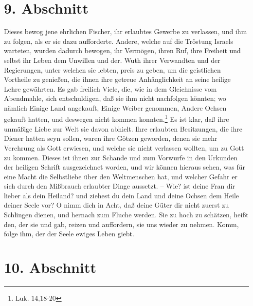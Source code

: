 \section{9. Abschnitt}

Dieses bewog jene ehrlichen Fischer, ihr erlaubtes Gewerbe zu verlassen, und ihm
zu folgen, als er sie dazu aufforderte. Andere, welche auf die Tröstung Israels
warteten, wurden dadurch bewogen, ihr Vermögen, ihren Ruf, ihre Freiheit und
selbst ihr Leben dem Unwillen und der. Wuth ihrer Verwandten und der
Regierungen, unter welchen sie lebten, preis zu geben, um die geistlichen
Vortheile zu genießen, die ihnen ihre getreue Anhänglichkeit an seine heilige
Lehre gewährten. Es gab freilich Viele, die, wie in dem Gleichnisse vom
Abendmahle, sich entschuldigen, daß sie ihm nicht nachfolgen könnten; wo nämlich
Einige Land angekauft, Einige Weiber genommen, Andere Ochsen gekauft hatten, und
deswegen nicht kommen konnten.\footnote{Luk. 14,18-20} Es ist klar, daß ihre
unmäßige Liebe zur Welt sie davon abhielt. Ihre erlaubten Besitzungen, die ihre
Diener hatten seyn sollen, waren ihre Götzen geworden, denen sie mehr Verehrung
als Gott erwiesen, und welche sie nicht verlassen wollten, um zu Gott zu kommen.
Dieses ist ihnen zur Schande und zum Vorwurfe in den Urkunden der heiligen
Schrift ausgezeichnet worden, und wir können hieraus sehen, was für eine Macht
die Selbstliebe über den Weltmenschen hat, und welcher Gefahr er sich durch den
Mißbrauch erlaubter Dinge aussetzt. -- Wie? ist deine Fran dir lieber als dein
Heiland? und ziehest du dein Land und deine Ochsen dem Heile deiner Seele vor? O
nimm dich in Acht, daß deine Güter dir nicht zuerst zu Schlingen dienen, und
hernach zum Fluche werden. Sie zu hoch zu schätzen, heißt den, der sie und gab,
reizen und auffordern, sie uns wieder zu nehmen. Komm, folge ihm, der der Seele
ewiges Leben giebt.

\section{10. Abschnitt}

